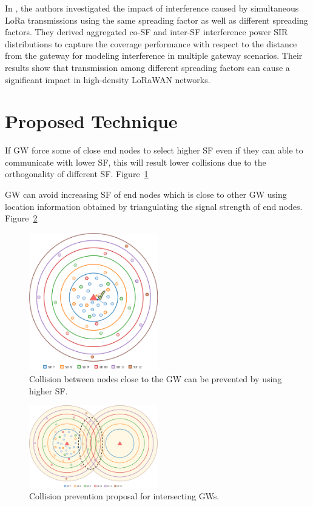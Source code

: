 \documentclass[conference]{IEEEtran}
\begin{document}
\par In \cite{8430542}, the authors investigated the impact of interference caused by simultaneous LoRa transmissions using the same spreading factor as well as different spreading factors. They derived aggregated co-SF and inter-SF interference power SIR distributions to capture the coverage performance with respect to the distance from the gateway for modeling interference in multiple gateway scenarios. Their results show that transmission among different spreading factors can cause a significant impact in high-density LoRaWAN networks.


\section{Proposed Technique} \label{Proposed Technique}
\par If GW force some of close end nodes to select higher SF even if they can able to communicate with lower SF, this will result lower collisions due to the orthogonality of different SF. Figure~\ref{fig:collision_solution_single_gw}

\par GW can avoid increasing SF of end nodes which is close to other GW using location information obtained by triangulating the signal strength of end nodes. Figure~\ref{fig:collision_solution_multi_gw}

\begin{figure}
\centering
\includegraphics[width=0.5\textwidth]{collision_solution_single_gw}
\caption{Collision between nodes close to the GW can be prevented by using higher SF.}
\label{fig:collision_solution_single_gw}
\end{figure}

\begin{figure}
\centering
\includegraphics[width=0.5\textwidth]{collision_solution_multi_gw}
\caption{Collision prevention proposal for intersecting GWs.}
\label{fig:collision_solution_multi_gw}
\end{figure}
\end{document}
